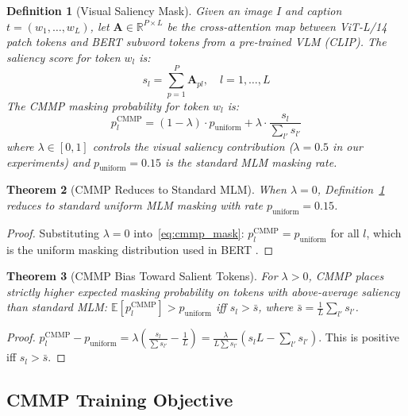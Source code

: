 \documentclass[10pt,conference]{IEEEtran}
\theoremstyle{ieeethm}
\newtheorem{theorem}{Theorem}
\theoremstyle{ieeedef}
\newtheorem{definition}[theorem]{Definition}
\theoremstyle{ieeeremark}
\begin{document}
\begin{definition}[Visual Saliency Mask]
\label{def:saliency}
Given an image $I$ and caption $t = (w_1, \ldots, w_L)$, let $\mathbf{A} \in \mathbb{R}^{P \times L}$ be the cross-attention map between ViT-L/14 patch tokens and BERT subword tokens from a pre-trained VLM (CLIP). The saliency score for token $w_l$ is:
\begin{equation}
s_l = \sum_{p=1}^{P} \mathbf{A}_{pl},\quad l = 1, \ldots, L
\label{eq:saliency}
\end{equation}
The CMMP masking probability for token $w_l$ is:
\begin{equation}
p_l^\text{CMMP} = (1-\lambda)\cdot p_\text{uniform} + \lambda \cdot \frac{s_l}{\sum_{l'} s_{l'}}
\label{eq:cmmp_mask}
\end{equation}
where $\lambda \in [0,1]$ controls the visual saliency contribution ($\lambda{=}0.5$ in our experiments) and $p_\text{uniform} = 0.15$ is the standard MLM masking rate.
\end{definition}

\begin{theorem}[CMMP Reduces to Standard MLM]
\label{thm:cmmp_reduce}
When $\lambda = 0$, Definition~\ref{def:saliency} reduces to standard uniform MLM masking with rate $p_\text{uniform} = 0.15$.
\end{theorem}
\begin{proof}
Substituting $\lambda = 0$ into~\eqref{eq:cmmp_mask}: $p_l^\text{CMMP} = p_\text{uniform}$ for all $l$, which is the uniform masking distribution used in BERT \cite{devlin2019bert}.
\end{proof}

\begin{theorem}[CMMP Bias Toward Salient Tokens]
\label{thm:cmmp_bias}
For $\lambda > 0$, CMMP places strictly higher expected masking probability on tokens with above-average saliency than standard MLM: $\mathbb{E}[p_l^\text{CMMP}] > p_\text{uniform}$ iff $s_l > \bar{s}$, where $\bar{s} = \frac{1}{L}\sum_{l'}s_{l'}$.
\end{theorem}
\begin{proof}
$p_l^\text{CMMP} - p_\text{uniform} = \lambda\left(\frac{s_l}{\sum s_{l'}} - \frac{1}{L}\right) = \frac{\lambda}{L\sum s_{l'}}(s_l L - \sum_{l'} s_{l'})$. This is positive iff $s_l > \bar{s}$.
\end{proof}

\subsection{CMMP Training Objective}
\end{document}
